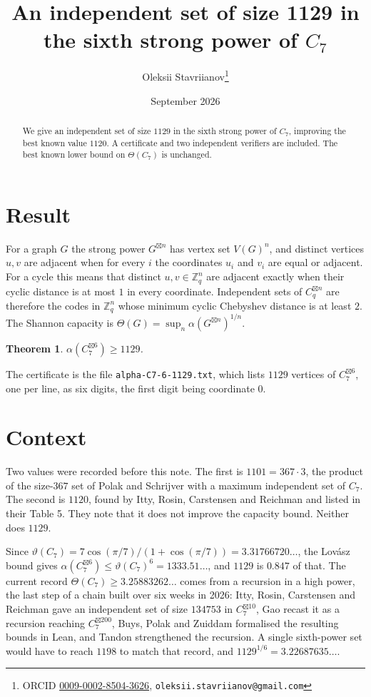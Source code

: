 \documentclass[11pt,a4paper]{article}
\title{An independent set of size 1129 in the sixth strong power of $C_7$}
\author{Oleksii Stavriianov\thanks{ORCID \href{https://orcid.org/0009-0002-8504-3626}{0009-0002-8504-3626}, \texttt{oleksii.stavriianov@gmail.com}}}
\date{September 2026}
\newcommand{\bt}{\boxtimes}
\newcommand{\al}{\alpha}
\newtheorem{theorem}{Theorem}
\begin{document}
\maketitle

\begin{abstract}
We give an independent set of size $1129$ in the sixth strong power of $C_7$, improving the
best known value $1120$. A certificate and two independent verifiers are included. The best
known lower bound on $\Theta(C_7)$ is unchanged.
\end{abstract}

\section{Result}

For a graph $G$ the strong power $G^{\bt n}$ has vertex set $V(G)^n$, and distinct vertices
$u,v$ are adjacent when for every $i$ the coordinates $u_i$ and $v_i$ are equal or adjacent.
For a cycle this means that distinct $u,v \in \mathbb{Z}_q^n$ are adjacent exactly when their
cyclic distance is at most $1$ in every coordinate. Independent sets of $C_q^{\bt n}$ are
therefore the codes in $\mathbb{Z}_q^n$ whose minimum cyclic Chebyshev distance is at
least $2$. The Shannon capacity is $\Theta(G) = \sup_n \al(G^{\bt n})^{1/n}$.

\begin{theorem}
$\al(C_7^{\bt 6}) \ge 1129$.
\end{theorem}

The certificate is the file \texttt{alpha-C7-6-1129.txt}, which lists $1129$ vertices of
$C_7^{\bt 6}$, one per line, as six digits, the first digit being coordinate $0$.

\section{Context}

Two values were recorded before this note. The first is $1101 = 367 \cdot 3$, the product of
the size-$367$ set of Polak and Schrijver \cite{PS} with a maximum independent set of $C_7$.
The second is $1120$, found by Itty, Rosin, Carstensen and Reichman \cite{Itty} and listed in
their Table 5. They note that it does not improve the capacity bound. Neither does $1129$.

Since $\vartheta(C_7) = 7\cos(\pi/7)/(1+\cos(\pi/7)) = 3.31766720\ldots$, the Lov\'asz bound
\cite{Lovasz} gives $\al(C_7^{\bt 6}) \le \vartheta(C_7)^6 = 1333.51\ldots$, and $1129$ is
$0.847$ of that. The current record $\Theta(C_7) \ge 3.25883262\ldots$ comes from a recursion
in a high power, the last step of a chain built over six weeks in 2026: Itty, Rosin,
Carstensen and Reichman \cite{Itty} gave an independent set of size $134753$ in
$C_7^{\bt 10}$, Gao \cite{Gao} recast it as a recursion reaching $C_7^{\bt 200}$, Buys, Polak
and Zuiddam \cite{BPZ} formalised the resulting bounds in Lean, and Tandon \cite{Tandon}
strengthened the recursion. A single sixth-power set would have to reach $1198$ to match that
record, and $1129^{1/6} = 3.22687635\ldots$.
\end{document}
